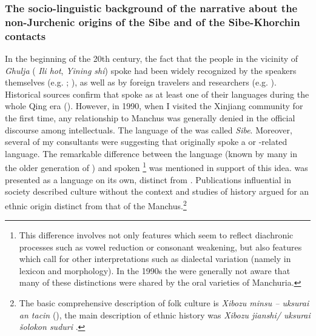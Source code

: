 \documentclass[output=paper,colorlinks,citecolor=brown]{langscibook}
\begin{document}
\subsubsection{The socio-linguistic background of the narrative about the non-Jurchenic origins of the Sibe and of the Sibe-Khorchin contacts}\largerpage

In the beginning of the 20th century, the fact that the  people in the vicinity of \textit{Ghulja} ( \textit{Ili hot},  \textit{Yining shi}) spoke  had been widely recognized by the speakers themselves (e.g. \citealt{Donjina1989}; \citealt[10--12]{Porter2018}), as well as by foreign travelers and researchers (e.g. \citealt{Kałużyński1987}). Historical sources confirm that  spoke  as at least one of their languages during the whole Qing era (\citealt[51]{Zhuangsheng2019}). However, in 1990, when I visited the Xinjiang  community for the first time, any relationship to Manchus was generally denied in the official discourse among  intellectuals. The language of the  was called \textit{Sibe}. Moreover, several of my  consultants were suggesting that  originally spoke a  or -related language. The remarkable difference between the  language (known by many in the older generation of ) and spoken \footnote{This difference involves not only features which seem to reflect diachronic processes such as vowel reduction or consonant weakening, but also features which call for other interpretations such as dialectal variation (namely in lexicon and morphology). In the 1990s the  were generally not aware that many of these distinctions were shared by the oral varieties of Manchuria.} was mentioned in support of this idea.  was presented as a language on its own, distinct from . Publications influential in  society described  culture without the  context and studies of  history argued for an ethnic origin distinct from that of the Manchus.\footnote{The basic comprehensive description of  folk culture is \textit{Xibozu minsu –  uksurai an tacin} (\citealt{He1989}), the main description of  ethnic history was \textit{Xibozu jianshi/ uksurai šolokon suduri} \citep{Wu1985}.}
\end{document}
